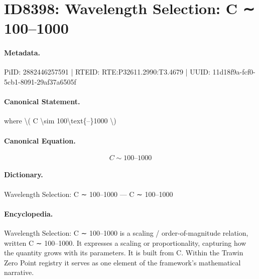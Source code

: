 \section*{ID8398: Wavelength Selection: C ∼ 100–1000}
\paragraph{Metadata.}
PiID: 2882446257591 | RTEID: RTE:P32611.2990:T3.4679 | UUID: 11d18f9a-fcf0-5cb1-8091-29af37a6505f

\paragraph{Canonical Statement.}
where \textbackslash{}( C \textbackslash{}sim 100\textbackslash{}text\{–\}1000 \textbackslash{})

\paragraph{Canonical Equation.}
\[
C \sim 100\text{–}1000
\]

\paragraph{Dictionary.}
Wavelength Selection: C ∼ 100–1000 — C ∼ 100–1000

\paragraph{Encyclopedia.}
Wavelength Selection: C ∼ 100–1000 is a scaling / order-of-magnitude relation, written C ∼ 100–1000. It expresses a scaling or proportionality, capturing how the quantity grows with its parameters. It is built from C. Within the Trawin Zero Point registry it serves as one element of the framework's mathematical narrative.
